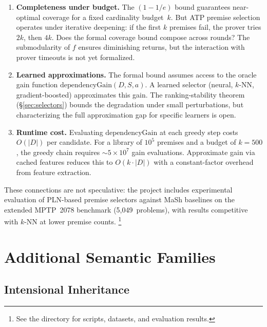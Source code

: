 \documentclass[11pt,openany]{report}
\begin{document}
\begin{enumerate}
\item \textbf{Completeness under budget.}  The $(1 - 1/e)$ bound
  guarantees near-optimal coverage for a fixed cardinality budget~$k$.
  But ATP premise selection operates under iterative deepening:
  if the first $k$ premises fail, the prover tries $2k$, then $4k$.
  Does the formal coverage bound compose across rounds?  The
  submodularity of $f$ ensures diminishing returns, but the
  interaction with prover timeouts is not yet formalized.

\item \textbf{Learned approximations.}  The formal bound assumes
  access to the oracle gain function $\mathrm{dependencyGain}(D, S, a)$.
  A learned selector (neural, $k$-NN, gradient-boosted) approximates
  this gain.  The ranking-stability theorem
  (\S\ref{sec:selectors}) bounds the degradation under
  small perturbations, but characterizing the full approximation gap
  for specific learners is open.

\item \textbf{Runtime cost.}  Evaluating $\mathrm{dependencyGain}$
  at each greedy step costs $O(|D|)$ per candidate.  For a library
  of $10^5$ premises and a budget of $k = 500$, the greedy chain
  requires $\sim 5 \times 10^7$ gain evaluations.  Approximate
  gain via cached features reduces this to $O(k \cdot |D|)$ with a
  constant-factor overhead from feature extraction.
\end{enumerate}

\noindent
These connections are not speculative: the project includes
experimental evaluation of PLN-based premise selectors against MaSh
baselines on the extended MPTP~2078 benchmark (5,049~problems), with results
competitive with $k$-NN at lower premise counts.%
\footnote{See the  directory for scripts,
datasets, and evaluation results.}


\part{Additional Semantic Families}
\label{part:families}

\chapter{Intensional Inheritance}
\label{ch:intensional}
\end{document}
